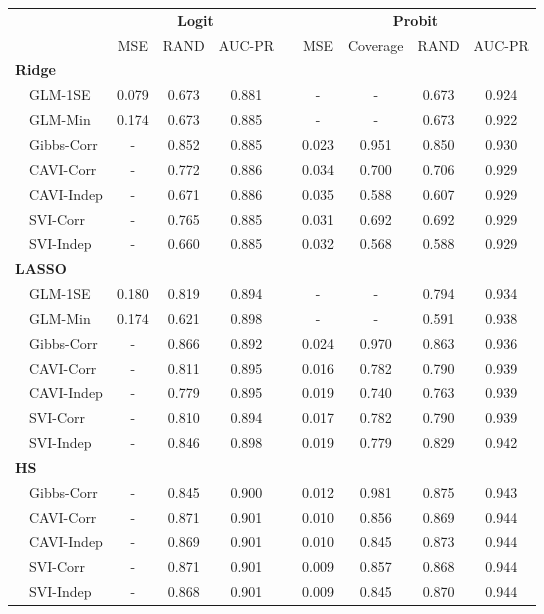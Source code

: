 \begin{center}
\begin{tabular}{lcccccccc}
\hline\hline
\multicolumn{1}{l}{\bfseries }&\multicolumn{3}{c}{\bfseries Logit}&\multicolumn{1}{c}{\bfseries }&\multicolumn{4}{c}{\bfseries Probit}\tabularnewline
\cline{2-4} \cline{6-9}
\multicolumn{1}{l}{}&\multicolumn{1}{c}{MSE}&\multicolumn{1}{c}{RAND}&\multicolumn{1}{c}{AUC-PR}&\multicolumn{1}{c}{}&\multicolumn{1}{c}{MSE}&\multicolumn{1}{c}{Coverage}&\multicolumn{1}{c}{RAND}&\multicolumn{1}{c}{AUC-PR}\tabularnewline
\hline
{\bfseries Ridge}&&&&&&&&\tabularnewline
~~GLM-1SE&0.079&0.673&0.881&&-&-&0.673&0.924\tabularnewline
~~GLM-Min&0.174&0.673&0.885&&-&-&0.673&0.922\tabularnewline
~~Gibbs-Corr&-&0.852&0.885&&0.023&0.951&0.850&0.930\tabularnewline
~~CAVI-Corr&-&0.772&0.886&&0.034&0.700&0.706&0.929\tabularnewline
~~CAVI-Indep&-&0.671&0.886&&0.035&0.588&0.607&0.929\tabularnewline
~~SVI-Corr&-&0.765&0.885&&0.031&0.692&0.692&0.929\tabularnewline
~~SVI-Indep&-&0.660&0.885&&0.032&0.568&0.588&0.929\tabularnewline
\hline
{\bfseries LASSO}&&&&&&&&\tabularnewline
~~GLM-1SE&0.180&0.819&0.894&&-&-&0.794&0.934\tabularnewline
~~GLM-Min&0.174&0.621&0.898&&-&-&0.591&0.938\tabularnewline
~~Gibbs-Corr&-&0.866&0.892&&0.024&0.970&0.863&0.936\tabularnewline
~~CAVI-Corr&-&0.811&0.895&&0.016&0.782&0.790&0.939\tabularnewline
~~CAVI-Indep&-&0.779&0.895&&0.019&0.740&0.763&0.939\tabularnewline
~~SVI-Corr&-&0.810&0.894&&0.017&0.782&0.790&0.939\tabularnewline
~~SVI-Indep&-&0.846&0.898&&0.019&0.779&0.829&0.942\tabularnewline
\hline
{\bfseries HS}&&&&&&&&\tabularnewline
~~Gibbs-Corr&-&0.845&0.900&&0.012&0.981&0.875&0.943\tabularnewline
~~CAVI-Corr&-&0.871&0.901&&0.010&0.856&0.869&0.944\tabularnewline
~~CAVI-Indep&-&0.869&0.901&&0.010&0.845&0.873&0.944\tabularnewline
~~SVI-Corr&-&0.871&0.901&&0.009&0.857&0.868&0.944\tabularnewline
~~SVI-Indep&-&0.868&0.901&&0.009&0.845&0.870&0.944\tabularnewline
\hline
\end{tabular}\end{center}

